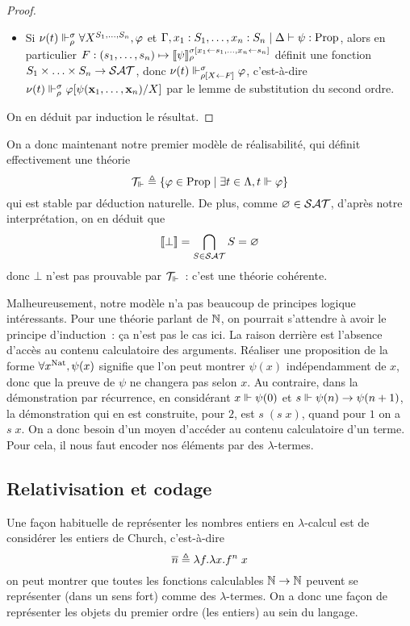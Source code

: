 \documentclass{article}
\begin{document}
\begin{proof}
\begin{itemize}
  \item Si $\nu(t)\Vdash_\rho^\sigma \forall X^{S_1,\ldots,S_n}, \varphi$ et $\Gamma,x_1 : S_1,\ldots,x_n : S_n\mid\Delta\vdash \psi : \mathrm{Prop}$, alors en particulier $F : (s_1,\ldots,s_n) \mapsto \llbracket \psi \rrbracket_\rho^{\sigma[x_1\leftarrow s_1,\ldots, x_n \leftarrow s_n]}$ définit une fonction $S_1\times\ldots\times S_n \to\mathcal {SAT}$, donc $\nu(t)\Vdash_{\rho[X\leftarrow F]}^\sigma \varphi$, c'est-à-dire $\nu(t)\Vdash_\rho^\sigma \varphi[\psi(\mathbf{x}_1,\ldots,\mathbf{x}_n)/X]$ par le lemme de substitution du second ordre.
  \end{itemize}

  On en déduit par induction le résultat.
\end{proof}

On a donc maintenant notre premier modèle de réalisabilité, qui définit effectivement une théorie
\[\mathcal T_\Vdash \triangleq \{\varphi \in \mathrm{Prop}\mid \exists t \in \Lambda, t \Vdash \varphi\}\]
qui est stable par déduction naturelle. De plus, comme $\varnothing \in \mathcal {SAT}$, d'après notre interprétation, on en déduit que
\[\llbracket \bot \rrbracket = \bigcap_{S \in \mathcal {SAT}} S = \varnothing\]
donc $\bot$ n'est pas prouvable par $\mathcal T_\Vdash$~: c'est une théorie cohérente.

Malheureusement, notre modèle n'a pas beaucoup de principes logique intéressants. Pour une théorie parlant de $\mathbb{N}$, on pourrait s'attendre à avoir le principe d'induction~: ça n'est pas le cas ici. La raison derrière est l'absence d'accès au contenu calculatoire des arguments. Réaliser une proposition de la forme $\forall x^{\mathrm{Nat}}, \psi(x)$ signifie que l'on peut montrer $\psi(x)$ indépendamment de $x$, donc que la preuve de $\psi$ ne changera pas selon $x$. Au contraire, dans la démonstration par récurrence, en considérant $x\Vdash \psi(0)$ et $s \Vdash \psi(n) \to \psi(n+1)$, la démonstration qui en est construite, pour $2$, est $s\;(s\;x)$, quand pour $1$ on a $s\;x$. On a donc besoin d'un moyen d'accéder au contenu calculatoire d'un terme. Pour cela, il nous faut encoder nos éléments par des $\lambda$-termes.

\subsection{Relativisation et codage}

Une façon habituelle de représenter les nombres entiers en $\lambda$-calcul est de considérer les entiers de Church, c'est-à-dire
\[\overline n \triangleq \lambda f.\lambda x.f^n\;x\]
on peut montrer que toutes les fonctions calculables $\mathbb{N}\to\mathbb{N}$ peuvent se représenter (dans un sens fort) comme des $\lambda$-termes. On a donc une façon de représenter les objets du premier ordre (les entiers) au sein du langage.
\end{document}
